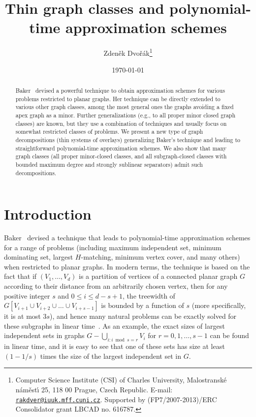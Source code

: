\documentclass[a4paper,11pt]{article}
\begin{document}
\title{Thin graph classes and polynomial-time approximation schemes}
\author{%
     Zden\v{e}k Dvo\v{r}\'ak\thanks{Computer Science Institute (CSI) of Charles University,
           Malostransk{\'e} n{\'a}m{\v e}st{\'\i} 25, 118 00 Prague, 
           Czech Republic. E-mail: \protect\href{mailto:rakdver@iuuk.mff.cuni.cz}{\protect\nolinkurl{rakdver@iuuk.mff.cuni.cz}}.
           Supported by (FP7/2007-2013)/ERC Consolidator grant LBCAD no. 616787.}
}
\date{\today}
\maketitle
\begin{abstract}
Baker~\cite{baker1994approximation} devised a powerful technique to obtain approximation schemes for various
problems restricted to planar graphs.  Her technique can be directly extended to various other graph classes,
among the most general ones the graphs avoiding a fixed apex graph as a minor.  Further generalizations (e.g.,
to all proper minor closed graph classes) are known, but they use a combination of techniques and usually focus
on somewhat restricted classes of problems.  We present a new type of graph decompositions (thin systems of overlays)
generalizing Baker's technique and leading to straightforward polynomial-time approximation schemes.
We also show that many graph classes (all proper minor-closed classes, and all subgraph-closed classes with bounded maximum
degree and strongly sublinear separators) admit such decompositions.
\end{abstract}

\section{Introduction}

Baker~\cite{baker1994approximation} devised a technique that leads to polynomial-time approximation schemes for
a range of problems (including maximum independent set, minimum dominating set, largest $H$-matching, minimum vertex cover,
and many others) when restricted to planar graphs.  In modern terms, the technique is based on the fact that
if $(V_1,\ldots, V_d)$ is a partition of vertices of a connected planar graph $G$ according to their distance from
an arbitrarily chosen vertex, then for any positive integer $s$ and $0\le i\le d-s+1$, the treewidth of $G[V_{i+1}\cup V_{i+2}\cup \ldots\cup V_{i+s-1}]$
is bounded by a function of $s$ (more specifically, it is at most $3s$), and hence many natural problems can be exactly solved
for these subgraphs in linear time~\cite{courcelle}.  As an example, the exact sizes of largest independent
sets in graphs $G-\bigcup_{i:i\bmod s=r} V_i$ for $r=0,1,\ldots,s-1$ can be found in linear time, and it is easy to see that one
of these sets has size at least $(1-1/s)$ times the size of the largest independent set in $G$.
\end{document}
